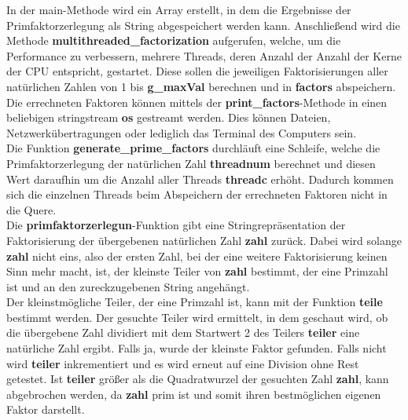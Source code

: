 \newpage
In der main-Methode wird ein Array erstellt, in dem die Ergebnisse der Primfaktorzerlegung als String abgespeichert werden kann.
Anschließend wird die Methode \textbf{multithreaded\_factorization} aufgerufen, welche, um die Performance zu verbessern, mehrere Threads, deren Anzahl der Anzahl der Kerne der CPU entspricht, gestartet. Diese sollen die jeweiligen Faktorisierungen aller natürlichen Zahlen von 1 bis \textbf{g\_maxVal} berechnen und in \textbf{factors} abspeichern.\\
Die errechneten Faktoren können mittels der \textbf{print\_factors}-Methode in einen beliebigen stringstream \textbf{os} gestreamt werden. Dies können Dateien, Netzwerkübertragungen oder lediglich das Terminal des Computers sein.\\
Die Funktion \textbf{generate\_prime\_factors} durchläuft eine Schleife, welche die Primfaktorzerlegung der natürlichen Zahl \textbf{threadnum} berechnet und diesen Wert daraufhin um die Anzahl aller Threads \textbf{threadc} erhöht. Dadurch kommen sich die einzelnen Threads beim Abspeichern der errechneten Faktoren nicht in die Quere.\\
Die \textbf{primfaktorzerlegun}-Funktion gibt eine Stringrepräsentation der Faktorisierung der übergebenen natürlichen Zahl \textbf{zahl} zurück. Dabei wird solange \textbf{zahl} nicht eins, also der ersten Zahl, bei der eine weitere Faktorisierung keinen Sinn mehr macht, ist, der kleinste Teiler von \textbf{zahl} bestimmt, der eine Primzahl ist und an den zureckzugebenen String angehängt.\\
Der kleinstmögliche Teiler, der eine Primzahl ist, kann mit der Funktion \textbf{teile} bestimmt werden. Der gesuchte Teiler wird ermittelt, in dem geschaut wird, ob die übergebene Zahl dividiert mit dem Startwert 2 des Teilers \textbf{teiler} eine natürliche Zahl ergibt. Falls ja, wurde der kleinste Faktor gefunden. Falls nicht wird \textbf{teiler} inkrementiert und es wird erneut auf eine Division ohne Rest getestet. Ist \textbf{teiler} größer als die Quadratwurzel der gesuchten Zahl \textbf{zahl}, kann abgebrochen werden, da \textbf{zahl} prim ist und somit ihren bestmöglichen eigenen Faktor darstellt.\\
